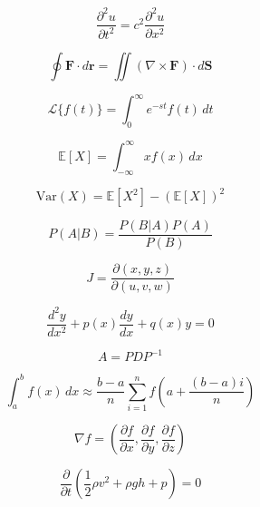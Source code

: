 \documentclass[UTF8,AutoFakeBold=1,AutoFakeSlant,zihao=-4]{SCAU}
\begin{document}
{\begin{equation} \label{eq8}
\frac{\partial^2 u}{\partial t^2} = c^2 \frac{\partial^2 u}{\partial x^2}
\end{equation}

\begin{equation} \label{eq9}
\oint \mathbf{F} \cdot d\mathbf{r} = \iint (\nabla \times \mathbf{F}) \cdot d\mathbf{S}
\end{equation}

\begin{equation} \label{eq10}
\mathcal{L}\{f(t)\} = \int_0^\infty e^{-st} f(t) \, dt
\end{equation}

\begin{equation} \label{eq11}
\mathbb{E}[X] = \int_{-\infty}^\infty x f(x) \, dx
\end{equation}

\begin{equation} \label{eq12}
\text{Var}(X) = \mathbb{E}[X^2] - (\mathbb{E}[X])^2
\end{equation}

\begin{equation} \label{eq13}
P(A|B) = \frac{P(B|A) P(A)}{P(B)}
\end{equation}

\begin{equation} \label{eq14}
J = \frac{\partial(x, y, z)}{\partial(u, v, w)}
\end{equation}

\begin{equation} \label{eq15}
\frac{d^2 y}{dx^2} + p(x) \frac{dy}{dx} + q(x) y = 0
\end{equation}

\begin{equation} \label{eq16}
A = P D P^{-1}
\end{equation}

\begin{equation} \label{eq17}
\int_a^b f(x) \, dx \approx \frac{b-a}{n} \sum_{i=1}^n f\left(a + \frac{(b-a)i}{n}\right)
\end{equation}

\begin{equation} \label{eq18}
\nabla f = \left( \frac{\partial f}{\partial x}, \frac{\partial f}{\partial y}, \frac{\partial f}{\partial z} \right)
\end{equation}

\begin{equation} \label{eq19}
\frac{\partial}{\partial t} \left( \frac{1}{2} \rho v^2 + \rho g h + p \right) = 0
\end{equation}

}
\end{document}
